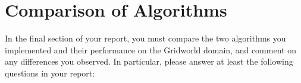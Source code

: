 \documentclass[11pt]{article}
\begin{document}
\section{Comparison of Algorithms}
In the final section of your report, you must
compare the two algorithms you implemented and their performance on the Gridworld
domain, and comment on any differences you observed. In particular, please answer at
least the following questions in your report:
\\
\end{document}
